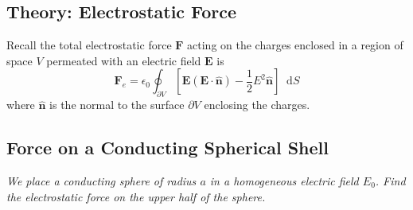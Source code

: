 \documentclass[11pt, a4paper]{article}
\newcommand{\diff}{\mathop{}\!\mathrm{d}} %
\renewcommand{\vec}[1]{\bm{#1}} %
\newcommand{\uvec}[1]{\hat{\vec{#1}}} %
\newcommand{\E}{\vec{E}}  %
\newcommand{\ee}{\epsilon_{0}}  %
\begin{document}
\subsection{Theory: Electrostatic Force}
Recall the total electrostatic force $ \vec{F} $ acting on the charges enclosed in a region of space $ V $ permeated with an electric field $ \E $ is
\begin{equation*}
	\vec{F}_{e} = \ee \oint_{\partial V}\left[\E(\E\cdot \uvec{n}) - \frac{1}{2}E^{2} \uvec{n}\right] \diff S
\end{equation*}
where $ \uvec{n} $ is the normal to the surface $ \partial V $ enclosing the charges.


\subsection{Force on a Conducting Spherical Shell}
\textit{We place a conducting sphere of radius $ a $ in a homogeneous electric field $ E_{0} $. Find the electrostatic force on the upper half of the sphere.}
\end{document}
